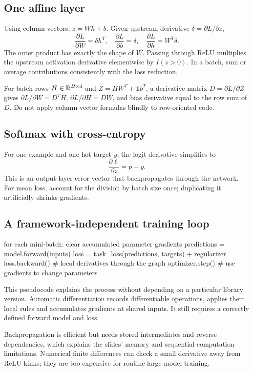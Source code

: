 \documentclass[11pt]{article}
\begin{document}
\subsection{One affine layer}
Using column vectors, $z=Wh+b$. Given upstream derivative $\delta=\partial L/\partial z$,
\[
\frac{\partial L}{\partial W}=\delta h^T,\quad
\frac{\partial L}{\partial b}=\delta,\quad
\frac{\partial L}{\partial h}=W^T\delta.
\]
The outer product has exactly the shape of $W$. Passing through ReLU multiplies the upstream activation derivative elementwise by $I(z>0)$. In a batch, sum or average contributions consistently with the loss reduction.

For batch rows $H\in\mathbb{R}^{B\times d}$ and $Z=HW^T+\mathbf1b^T$, a derivative matrix $D=\partial L/\partial Z$ gives $\partial L/\partial W=D^TH$, $\partial L/\partial H=DW$, and bias derivative equal to the row sum of $D$. Do not apply column-vector formulas blindly to row-oriented code.
\subsection{Softmax with cross-entropy}
For one example and one-hot target $y$, the logit derivative simplifies to
\[
\frac{\partial\ell}{\partial z}=p-y.
\]
This is an output-layer error vector that backpropagates through the network. For mean loss, account for the division by batch size once; duplicating it artificially shrinks gradients.
\subsection{A framework-independent training loop}
\begin{code}
for each mini-batch:
    clear accumulated parameter gradients
    predictions = model.forward(inputs)
    loss = task_loss(predictions, targets) + regularizer
    loss.backward()   # local derivatives through the graph
    optimizer.step()  # use gradients to change parameters
\end{code}
This pseudocode explains the process without depending on a particular library version. Automatic differentiation records differentiable operations, applies their local rules and accumulates gradients at shared inputs. It still requires a correctly defined forward model and loss.

Backpropagation is efficient but needs stored intermediates and reverse dependencies, which explains the slides' memory and sequential-computation limitations. Numerical finite differences can check a small derivative away from ReLU kinks; they are too expensive for routine large-model training.
\end{document}
